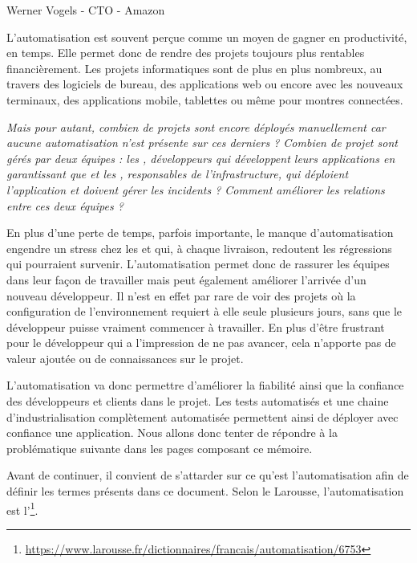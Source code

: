 \epigraph{}{Werner Vogels - \gls{CTO} - Amazon}

L'automatisation est souvent perçue comme un moyen de gagner en productivité, en temps. Elle permet donc de rendre des projets toujours plus rentables financièrement. Les projets informatiques sont de plus en plus nombreux, au travers des logiciels de bureau, des applications web ou encore avec les nouveaux terminaux, des applications mobile, tablettes ou même pour montres connectées.
	
\emph{Mais pour autant, combien de projets sont encore déployés manuellement car aucune automatisation n'est présente sur ces derniers ? Combien de projet sont gérés par deux équipes : les \frquote{\dev}, développeurs qui développent leurs applications en garantissant que  et les \frquote{\ops}, responsables de l'infrastructure, qui déploient l'application et doivent gérer les incidents ? Comment améliorer les relations entre ces deux équipes ?}
	
En plus d'une perte de temps, parfois importante, le manque d'automatisation engendre un stress chez les \dev{} et \ops{} qui, à chaque livraison, redoutent les régressions qui pourraient survenir. L'automatisation permet donc de rassurer les équipes dans leur façon de travailler mais peut également améliorer l'arrivée d'un nouveau développeur. Il n'est en effet par rare de voir des projets où la configuration de l'environnement requiert à elle seule plusieurs jours, sans que le développeur puisse vraiment commencer à travailler. En plus d'être frustrant pour le développeur qui a l'impression de ne pas avancer, cela n'apporte pas de valeur ajoutée ou de connaissances sur le projet.

L'automatisation va donc permettre d'améliorer la fiabilité ainsi que la confiance des développeurs et clients dans le projet. Les tests automatisés et une chaine d'industrialisation complètement automatisée permettent ainsi de déployer avec confiance une application. Nous allons donc tenter de répondre à la problématique suivante dans les pages composant ce mémoire.

\hrulefill

{\large \problematique}

\hrulefill

Avant de continuer, il convient de s'attarder sur ce qu'est l'automatisation afin de définir les termes présents dans ce document. Selon le Larousse, l'automatisation est l'\footnote{\url{https://www.larousse.fr/dictionnaires/francais/automatisation/6753}}. 


